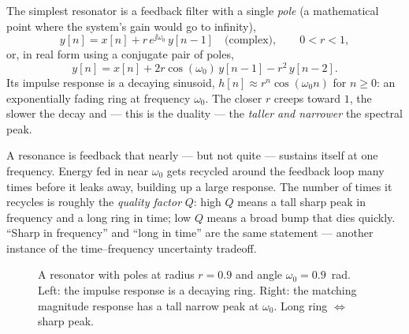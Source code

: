 The simplest resonator is a feedback filter with a single \emph{pole} (a mathematical point where the system's gain would go to infinity),
\begin{equation}
  y[n] = x[n] + r\,e^{\jj\omega_0}\, y[n-1] \quad\text{(complex)},
  \qquad 0 < r < 1,
  \label{ch14:reson}
\end{equation}
or, in real form using a conjugate pair of poles,
\[
  y[n] = x[n] + 2r\cos(\omega_0)\,y[n-1] - r^2\,y[n-2].
\]
Its impulse response is a decaying sinusoid, $h[n] \approx r^n\cos(\omega_0 n)$
for $n\ge0$: an exponentially fading ring at frequency $\omega_0$. The closer
$r$ creeps toward $1$, the slower the decay and --- this is the duality --- the
\emph{taller and narrower} the spectral peak.

\begin{intuitionbox}
A resonance is feedback that nearly --- but not quite --- sustains itself at one
frequency. Energy fed in near $\omega_0$ gets recycled around the feedback loop
many times before it leaks away, building up a large response. The number of
times it recycles is roughly the \emph{quality factor} $Q$: high $Q$ means a
tall sharp peak in frequency and a long ring in time; low $Q$ means a broad
bump that dies quickly. ``Sharp in frequency'' and ``long in time'' are the same
statement --- another instance of the time--frequency uncertainty tradeoff.
\end{intuitionbox}

\begin{figure}[H]
\centering
{}
\caption{A resonator with poles at radius $r=0.9$ and angle $\omega_0=0.9$~rad.
Left: the impulse response is a decaying ring. Right: the matching magnitude
response has a tall narrow peak at $\omega_0$. Long ring $\Leftrightarrow$
sharp peak.}
\label{ch14:fig-reson}
\end{figure}

